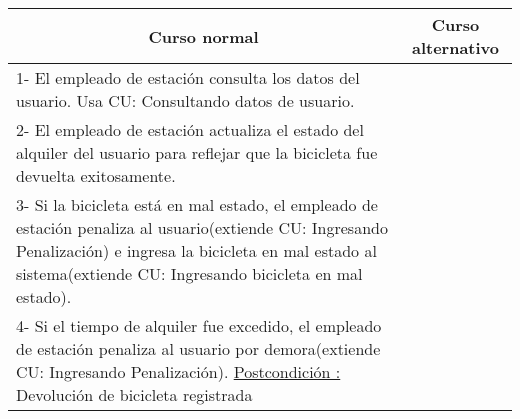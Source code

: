 \begin{center}
    \centering
    \begin{tabular}{ | p{11cm} | p{6cm} | }
    	\multicolumn{1}{c}{\cellcolor{black!30}\textbf{Curso normal}} & 
    	\multicolumn{1}{c}{\cellcolor{black!30}\textbf{Curso alternativo}} \\
		\hline
		1- El empleado de estación consulta los datos del usuario. Usa CU: Consultando datos de usuario. &  \\ \hline
		2- El empleado de estación actualiza el estado del alquiler del usuario para reflejar que la bicicleta fue devuelta exitosamente. &  \\ \hline
		3- Si la bicicleta está en mal estado, el empleado de estación penaliza al usuario(extiende CU: Ingresando Penalización) e ingresa la bicicleta en mal estado al sistema(extiende CU: Ingresando bicicleta en mal estado). &  \\ \hline	
		4- Si el tiempo de alquiler fue excedido, el empleado de estación penaliza al usuario por demora(extiende CU: Ingresando Penalización).
		\underline{Postcondición :} Devolución de bicicleta registrada & \\ \hline
    \end{tabular}
\end{center}

